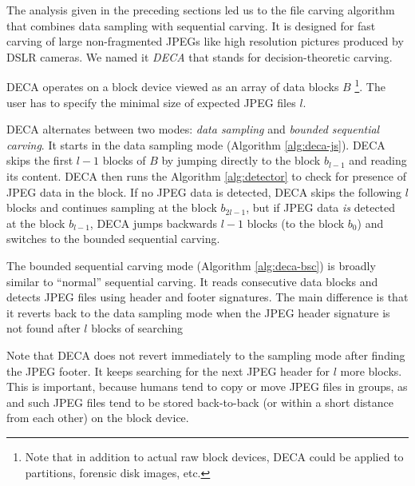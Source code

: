 \documentclass[final,5p,times,twocolumn,authoryear]{elsarticle}
\begin{document}
The analysis given in the preceding sections led us to the file carving algorithm that combines data sampling with sequential carving. It is designed for fast carving of large non-fragmented JPEGs like high resolution pictures produced by DSLR cameras. We named it \emph{DECA} that stands for decision-theoretic carving. 

DECA operates on a block device viewed as an array of data blocks $B$ \footnote{Note that in addition to actual raw block devices, DECA could be applied to partitions, forensic disk images, etc.}. The user has to specify the minimal size of expected JPEG files $l$. 

DECA alternates between two modes: \emph{data sampling} and \emph{bounded sequential carving}. It starts in the data sampling mode (Algorithm \ref{alg:deca-js}). DECA skips the first $l-1$ blocks of $B$ by jumping directly to the block $b_{l-1}$ and reading its content. DECA then runs the Algorithm \ref{alg:detector} to check for presence of JPEG data in the block. If no JPEG data is detected, DECA skips the following $l$ blocks and continues sampling at the block $b_{2l-1}$, but if JPEG data \emph{is} detected at the block $b_{l-1}$, DECA jumps backwards $l-1$ blocks (to the block $b_0$) and switches to the bounded sequential carving. 

The bounded sequential carving mode (Algorithm \ref{alg:deca-bsc}) is broadly similar to ``normal'' sequential carving. It reads consecutive data blocks and detects JPEG files using header and footer signatures. The main difference is that it reverts back to the data sampling mode when the JPEG header signature is not found after $l$ blocks of searching

Note that DECA does not revert immediately to the sampling mode after finding the JPEG footer. It keeps searching for the next JPEG header for $l$ more blocks. This is important, because humans tend to copy or move JPEG files in groups, as and such JPEG files tend to be stored back-to-back (or within a short distance from each other) on the block device. 
\end{document}
